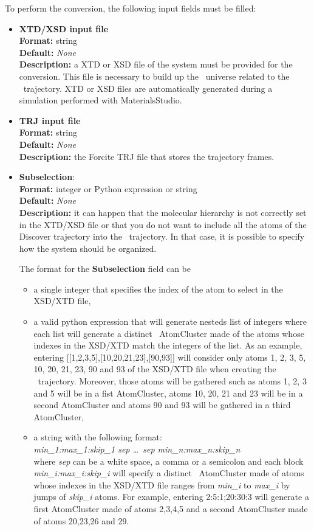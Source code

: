 \documentclass[a4paper,11pt]{report}
\begin{document}
To perform the conversion, the following input fields must be filled:
\begin{itemize}
\item \textbf{XTD/XSD input file}\\
\textbf{Format:} string\\
\textbf{Default:} \textit{None}\\
\textbf{Description:} a XTD or XSD file of the system must be provided for the conversion. This file is necessary to build up 
the \MMTK\ universe related to the \MMTK\ trajectory. XTD or XSD files are automatically generated during a simulation performed 
with MaterialsStudio.

\item \textbf{TRJ input file}\\
\textbf{Format:} string\\
\textbf{Default:} \textit{None}\\
\textbf{Description:} the Forcite TRJ file that stores the trajectory frames.

\item \textbf{Subselection}:\\
\textbf{Format:} integer or Python expression or string\\
\textbf{Default:} \textit{None}\\
\textbf{Description:} it can happen that the molecular hierarchy is not correctly set in the XTD/XSD file or that 
you do not want to include all the atoms of the Discover trajectory into the \MMTK\ trajectory. In that case, 
it is possible to specify how the system should be organized.

The format for the \textbf{Subselection} field can be
\begin{itemize}
\item a single integer that specifies the index of the atom to select in the XSD/XTD file,
\item a valid python expression that will generate nesteds list of integers where each list will generate a 
distinct \MMTK\ AtomCluster made of the atoms whose indexes in the XSD/XTD match the integers of the list. As an example, 
entering [[1,2,3,5],[10,20,21,23],[90,93]] will consider only atoms 1, 2, 3, 5, 10, 20, 21, 23, 90 and 93 of the XSD/XTD file when creating the \MMTK\ trajectory. Moreover, those atoms will be gathered 
such as atoms 1, 2, 3 and 5 will be in a fist AtomCluster, atoms 10, 20, 21 and 23 will be in a second AtomCluster and atoms 
90 and 93 will be gathered in a third AtomCluster,
\item a string with the following format:\\
\textit{min\_1:max\_1:skip\_1 sep \ldots\ sep min\_n:max\_n:skip\_n}\\
where \textit{sep} can be a white space, a comma or a semicolon and each block \textit{min\_i:max\_i:skip\_i} will specify a distinct \MMTK\ AtomCluster made of atoms 
whose indexes in the XSD/XTD file ranges from \textit{min\_i} to \textit{max\_i} by jumps of \textit{skip\_i} atoms. For example, entering 2:5:1;20:30:3 will generate a first AtomCluster made of atoms 2,3,4,5 and a second AtomCluster made of atoms 20,23,26 and 29.
\end{itemize}


\end{itemize}
\end{document}
